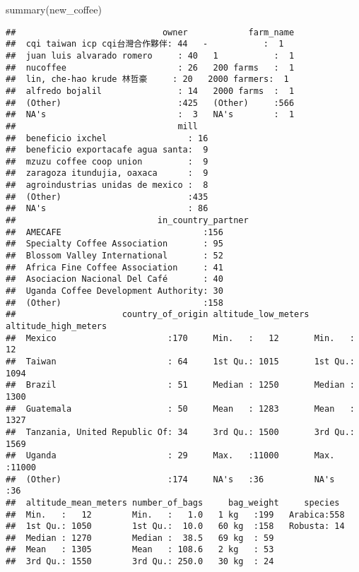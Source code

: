\documentclass[
]{article}
\newenvironment{Shaded}{\begin{snugshade}}{\end{snugshade}}
\newcommand{\FunctionTok}[1]{\textcolor[rgb]{0.00,0.00,0.00}{#1}}
\newcommand{\NormalTok}[1]{#1}
\begin{document}
\begin{Shaded}
\begin{Highlighting}[]
\FunctionTok{summary}\NormalTok{(new\_coffee)}
\end{Highlighting}
\end{Shaded}

\begin{verbatim}
##                             owner            farm_name  
##  cqi taiwan icp cqi台灣合作夥伴: 44   -           :  1  
##  juan luis alvarado romero     : 40   1           :  1  
##  nucoffee                      : 26   200 farms   :  1  
##  lin, che-hao krude 林哲豪     : 20   2000 farmers:  1  
##  alfredo bojalil               : 14   2000 farms  :  1  
##  (Other)                       :425   (Other)     :566  
##  NA's                          :  3   NA's        :  1  
##                                mill    
##  beneficio ixchel                : 16  
##  beneficio exportacafe agua santa:  9  
##  mzuzu coffee coop union         :  9  
##  zaragoza itundujia, oaxaca      :  9  
##  agroindustrias unidas de mexico :  8  
##  (Other)                         :435  
##  NA's                            : 86  
##                            in_country_partner
##  AMECAFE                            :156     
##  Specialty Coffee Association       : 95     
##  Blossom Valley International       : 52     
##  Africa Fine Coffee Association     : 41     
##  Asociacion Nacional Del Café       : 40     
##  Uganda Coffee Development Authority: 30     
##  (Other)                            :158     
##                     country_of_origin altitude_low_meters altitude_high_meters
##  Mexico                      :170     Min.   :   12       Min.   :   12       
##  Taiwan                      : 64     1st Qu.: 1015       1st Qu.: 1094       
##  Brazil                      : 51     Median : 1250       Median : 1300       
##  Guatemala                   : 50     Mean   : 1283       Mean   : 1327       
##  Tanzania, United Republic Of: 34     3rd Qu.: 1500       3rd Qu.: 1569       
##  Uganda                      : 29     Max.   :11000       Max.   :11000       
##  (Other)                     :174     NA's   :36          NA's   :36          
##  altitude_mean_meters number_of_bags     bag_weight     species   
##  Min.   :   12        Min.   :   1.0   1 kg   :199   Arabica:558  
##  1st Qu.: 1050        1st Qu.:  10.0   60 kg  :158   Robusta: 14  
##  Median : 1270        Median :  38.5   69 kg  : 59                
##  Mean   : 1305        Mean   : 108.6   2 kg   : 53                
##  3rd Qu.: 1550        3rd Qu.: 250.0   30 kg  : 24                

\end{verbatim}
\end{document}
